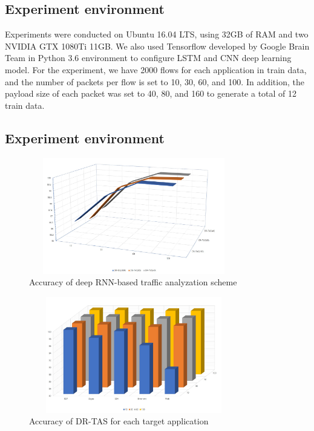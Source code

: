 \documentclass[10pt, twoside, jounal]{IEEEtran}
\begin{document}
\subsection{Experiment environment}
Experiments were conducted on Ubuntu 16.04 LTS, using 32GB of RAM and two NVIDIA GTX 1080Ti 11GB.
We also used Tensorflow developed by Google Brain Team in Python 3.6 environment to configure LSTM and CNN deep learning model.
For the experiment, we have 2000 flows for each application in train data, and the number of packets per flow is set to 10, 30, 60, and 100.
In addition, the payload size of each packet was set to 40, 80, and 160 to generate a total of 12 train data.

\subsection{Experiment environment}
\begin{figure}[!t]
\centering
\setlength{\abovecaptionskip}{0pt}
\setlength{\belowcaptionskip}{0pt}
{
\includegraphics[width=3.6in, height=2.0in]{fig3.jpg}
\caption{Accuracy of deep RNN-based traffic analyzation scheme}
\label{fig3}
}
\end{figure}
\begin{figure}[!t]
\centering
\setlength{\abovecaptionskip}{0pt}
\setlength{\belowcaptionskip}{0pt}
{
\includegraphics[width=3.6in, height=2.0in]{fig4.jpg}
\caption{Accuracy of DR-TAS for each target application}
\label{fig4}
}
\end{figure}
\end{document}
